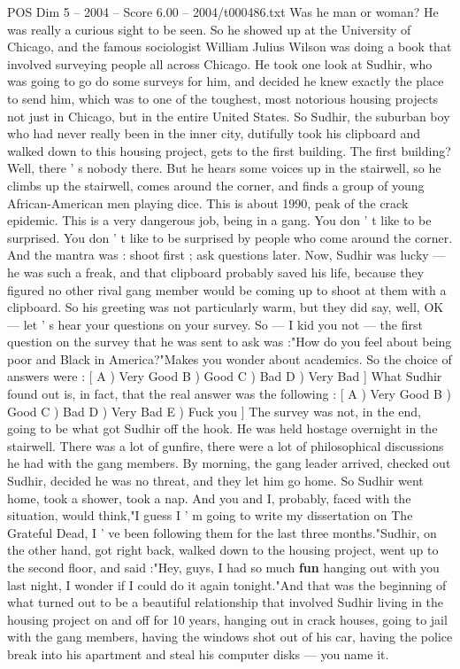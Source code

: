 \begin{textsample}{POS Dim 5 – 2004 – Score 6.00 – 2004/t000486.txt}
Was he man or woman?
He was really a curious sight to be seen.
So he showed up at the University of Chicago, and the famous sociologist William Julius Wilson was doing a book that involved surveying people all across Chicago.
He took one look at Sudhir, who was going to go do some surveys for him, and decided he knew exactly the place to send him, which was to one of the toughest, most notorious housing projects not just in Chicago, but in the entire United States.
So Sudhir, the suburban boy who had never really been in the inner city, dutifully took his clipboard and walked down to this housing project, gets to the first building.
The first building?
Well, there ' s nobody there.
But he hears some voices up in the stairwell, so he climbs up the stairwell, comes around the corner, and finds a group of young African-American men playing dice.
This is about 1990, peak of the crack epidemic.
This is a very dangerous job, being in a gang.
You don ' t like to be surprised.
You don ' t like to be surprised by people who come around the corner.
And the mantra was : shoot first ; ask questions later.
Now, Sudhir was lucky — he was such a freak, and that clipboard probably saved his life, because they figured no other rival gang member would be coming up to shoot at them with a clipboard.
So his greeting was not particularly warm, but they did say, well, OK — let ' s hear your questions on your survey.
So — I kid you not — the first question on the survey that he was sent to ask was :"How do you feel about being poor and Black in America?"Makes you wonder about academics.
So the choice of answers were : [ A ) Very Good B ) Good C ) Bad D ) Very Bad ] What Sudhir found out is, in fact, that the real answer was the following : [ A ) Very Good B ) Good C ) Bad D ) Very Bad E ) Fuck you ] The survey was not, in the end, going to be what got Sudhir off the hook.
He was held hostage overnight in the stairwell.
There was a lot of gunfire, there were a lot of philosophical discussions he had with the gang members.
By morning, the gang leader arrived, checked out Sudhir, decided he was no threat, and they let him go home.
So Sudhir went home, took a shower, took a nap.
And you and I, probably, faced with the situation, would think,"I guess I ' m going to write my dissertation on The Grateful Dead, I ' ve been following them for the last three months."Sudhir, on the other hand, got right back, walked down to the housing project, went up to the second floor, and said :"Hey, guys, I had so much \textbf{fun} hanging out with you last night, I wonder if I could do it again tonight."And that was the beginning of what turned out to be a beautiful relationship that involved Sudhir living in the housing project on and off for 10 years, hanging out in crack houses, going to jail with the gang members, having the windows shot out of his car, having the police break into his apartment and steal his computer disks — you name it.

\end{textsample}
